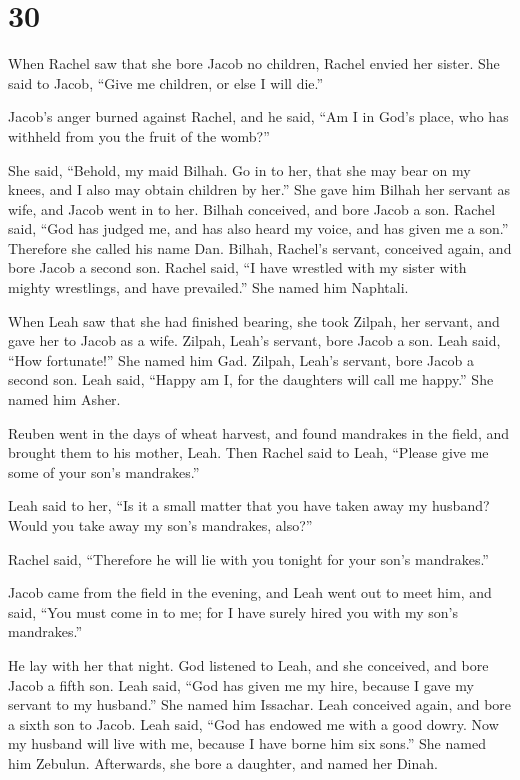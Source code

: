 \hypertarget{section-29}{%
\section{30}\label{section-29}}

 When Rachel saw that she bore Jacob no children, Rachel
envied her sister. She said to Jacob, ``Give me children, or else I will
die.''

 Jacob's anger burned against Rachel, and he said, ``Am I
in God's place, who has withheld from you the fruit of the womb?''

 She said, ``Behold, my maid Bilhah. Go in to her, that
she may bear on my knees, and I also may obtain children by her.''
 She gave him Bilhah her servant as wife, and Jacob went
in to her.  Bilhah conceived, and bore Jacob a son.
 Rachel said, ``God has judged me, and has also heard my
voice, and has given me a son.'' Therefore she called his name Dan.
 Bilhah, Rachel's servant, conceived again, and bore Jacob
a second son.  Rachel said, ``I have wrestled with my
sister with mighty wrestlings, and have prevailed.'' She named him
Naphtali.

 When Leah saw that she had finished bearing, she took
Zilpah, her servant, and gave her to Jacob as a wife. 
Zilpah, Leah's servant, bore Jacob a son.  Leah said,
``How fortunate!'' She named him Gad.  Zilpah, Leah's
servant, bore Jacob a second son.  Leah said, ``Happy am
I, for the daughters will call me happy.'' She named him Asher.

 Reuben went in the days of wheat harvest, and found
mandrakes in the field, and brought them to his mother, Leah. Then
Rachel said to Leah, ``Please give me some of your son's mandrakes.''

 Leah said to her, ``Is it a small matter that you have
taken away my husband? Would you take away my son's mandrakes, also?''

Rachel said, ``Therefore he will lie with you tonight for your son's
mandrakes.''

 Jacob came from the field in the evening, and Leah went
out to meet him, and said, ``You must come in to me; for I have surely
hired you with my son's mandrakes.''

He lay with her that night.  God listened to Leah, and
she conceived, and bore Jacob a fifth son.  Leah said,
``God has given me my hire, because I gave my servant to my husband.''
She named him Issachar.  Leah conceived again, and bore a
sixth son to Jacob.  Leah said, ``God has endowed me with
a good dowry. Now my husband will live with me, because I have borne him
six sons.'' She named him Zebulun.  Afterwards, she bore
a daughter, and named her Dinah.


